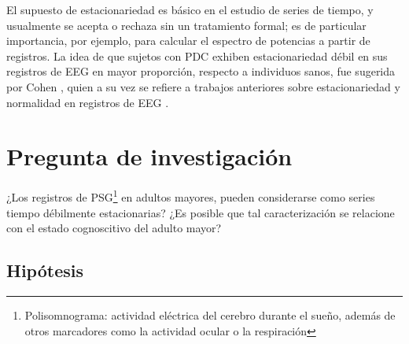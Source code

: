 El supuesto de estacionariedad es básico en el estudio de series de tiempo, y usualmente se 
acepta o rechaza sin un tratamiento formal; es de particular importancia, por ejemplo, para 
calcular el espectro de potencias a partir de registros.
La idea de que sujetos con PDC exhiben estacionariedad débil en sus registros de EEG en mayor 
proporción, respecto a individuos sanos, fue sugerida por Cohen \cite{Cohen77}, quien a su vez se 
refiere a trabajos anteriores sobre estacionariedad y normalidad en registros de EEG 
\cite{McEwen75,Sugimoto78,Kawabata73}.




\section{Pregunta de investigación}

¿Los registros de PSG\footnote{Polisomnograma: actividad eléctrica del cerebro durante el sueño,
además de otros marcadores como la actividad ocular o la respiración} en adultos mayores, pueden
considerarse como series tiempo débilmente estacionarias?
¿Es posible que tal caracterización se relacione con el estado cognoscitivo del adulto mayor?


\subsection{Hipótesis}

